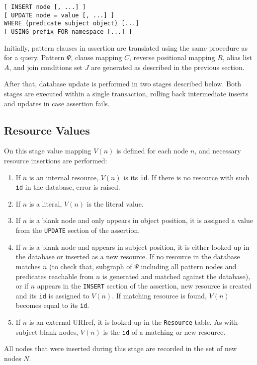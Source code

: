 \documentclass{llncs}
\begin{document}
\begin{verbatim}
[ INSERT node [, ...] ]
[ UPDATE node = value [, ...] ]
WHERE (predicate subject object) [...]
[ USING prefix FOR namespace [...] ]
\end{verbatim}

Initially, pattern clauses in assertion are translated using the same
procedure as for a query. Pattern $\Psi$, clause mapping $C$, reverse
positional mapping $R$, alias list $A$, and join conditions set $J$ are
generated as described in the previous section.

After that, database update is performed in two stages described below. Both
stages are executed within a single transaction, rolling back intermediate
inserts and updates in case assertion fails.

\subsection{Resource Values}

On this stage value mapping $V(n)$ is defined for each node $n$, and necessary
resource insertions are performed:

\begin{enumerate}
\item If $n$ is an internal resource, $V(n)$ is its {\tt id}. If there is no
resource with such {\tt id} in the database, error is raised.
\item If $n$ is a literal, $V(n)$ is the literal value.
\item If $n$ is a blank node and only appears in object position, it is
assigned a value from the {\tt UPDATE} section of the assertion.
\item If $n$ is a blank node and appears in subject position, it is either
looked up in the database or inserted as a new resource. If no resource in the
database matches $n$ (to check that, subgraph of $\Psi$ including all pattern
nodes and predicates reachable from $n$ is generated and matched against the
database), or if $n$ appears in the {\tt INSERT} section of the assertion, new
resource is created and its {\tt id} is assigned to $V(n)$. If matching
resource is found, $V(n)$ becomes equal to its {\tt id}.
\item If $n$ is an external URIref, it is looked up in the {\tt Resource}
table. As with subject blank nodes, $V(n)$ is the {\tt id} of a matching or
new resource.
\end{enumerate}

All nodes that were inserted during this stage are recorded in the set of new
nodes $N$.
\end{document}
